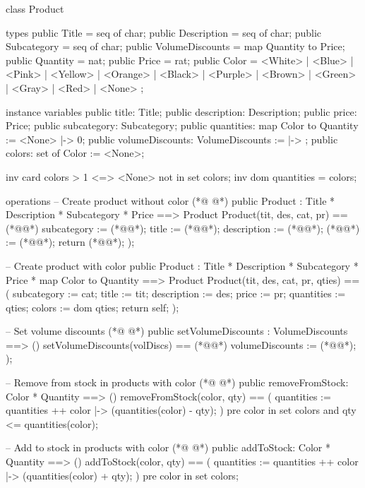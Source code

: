 \begin{vdmpp}[breaklines=true]
class Product

types
 public Title = seq of char;
 public Description = seq of char;
 public Subcategory = seq of char;
 public VolumeDiscounts =  map Quantity to Price;
 public Quantity = nat;
 public Price = rat;
 public Color = <White> | <Blue> | <Pink> | <Yellow> | <Orange> | <Black> | <Purple> | <Brown> | <Green> | <Gray> | <Red> | <None> ;
 
instance variables
  public title: Title;
  public description: Description;
  public price: Price;
  public subcategory: Subcategory;
  public quantities: map Color to Quantity := { <None> |-> 0};
  public volumeDiscounts: VolumeDiscounts := { |-> };
  public colors: set of Color := {<None>};
  
  inv card colors > 1 <=> <None> not in set colors;
  inv dom quantities = colors;

operations
 -- Create product without color
(*@
\label{Product:26}
@*)
 public Product : Title * Description * Subcategory * Price  ==> Product
 Product(tit, des, cat, pr) == (*@\vdmnotcovered{(}@*)
  subcategory := (*@@*);
   title := (*@@*);
   description := (*@@*);
   (*@@*) := (*@@*);
   return (*@@*);
 );
 
 -- Create product with color
 public Product : Title * Description * Subcategory * Price * map Color to Quantity ==> Product
 Product(tit, des, cat, pr, qties) == (
  subcategory := cat;
   title := tit;
   description := des;
   price := pr;
   quantities := qties;
   colors := dom qties;
   return self;
 );
  
 -- Set volume discounts
(*@
\label{setVolumeDiscounts:48}
@*)
 public setVolumeDiscounts : VolumeDiscounts ==> ()
 setVolumeDiscounts(volDiscs) == (*@\vdmnotcovered{(}@*)
  volumeDiscounts := (*@@*);
 );
 
 -- Remove from stock in products with color
(*@
\label{removeFromStock:54}
@*)
 public removeFromStock: Color * Quantity ==> ()
 removeFromStock(color, qty) == (
  quantities := quantities ++ {color |-> (quantities(color) - qty)};
 )
 pre color in set colors
  and qty <= quantities(color);
 
 -- Add to stock in products with color
(*@
\label{addToStock:62}
@*)
 public addToStock: Color * Quantity ==> ()
 addToStock(color, qty) == (
  quantities := quantities ++ {color |-> (quantities(color) + qty)};
 )
 pre color in set colors;
 

\end{vdmpp}
